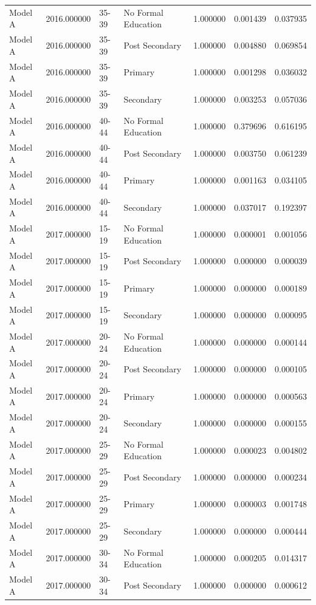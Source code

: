 \begin{table}[ht]
\begin{tabular}{lrllrrr}
Model A & 2016.000000 & 35-39 & No Formal Education & 1.000000 & 0.001439 & 0.037935 \\
Model A & 2016.000000 & 35-39 & Post Secondary & 1.000000 & 0.004880 & 0.069854 \\
Model A & 2016.000000 & 35-39 & Primary & 1.000000 & 0.001298 & 0.036032 \\
Model A & 2016.000000 & 35-39 & Secondary & 1.000000 & 0.003253 & 0.057036 \\
Model A & 2016.000000 & 40-44 & No Formal Education & 1.000000 & 0.379696 & 0.616195 \\
Model A & 2016.000000 & 40-44 & Post Secondary & 1.000000 & 0.003750 & 0.061239 \\
Model A & 2016.000000 & 40-44 & Primary & 1.000000 & 0.001163 & 0.034105 \\
Model A & 2016.000000 & 40-44 & Secondary & 1.000000 & 0.037017 & 0.192397 \\
Model A & 2017.000000 & 15-19 & No Formal Education & 1.000000 & 0.000001 & 0.001056 \\
Model A & 2017.000000 & 15-19 & Post Secondary & 1.000000 & 0.000000 & 0.000039 \\
Model A & 2017.000000 & 15-19 & Primary & 1.000000 & 0.000000 & 0.000189 \\
Model A & 2017.000000 & 15-19 & Secondary & 1.000000 & 0.000000 & 0.000095 \\
Model A & 2017.000000 & 20-24 & No Formal Education & 1.000000 & 0.000000 & 0.000144 \\
Model A & 2017.000000 & 20-24 & Post Secondary & 1.000000 & 0.000000 & 0.000105 \\
Model A & 2017.000000 & 20-24 & Primary & 1.000000 & 0.000000 & 0.000563 \\
Model A & 2017.000000 & 20-24 & Secondary & 1.000000 & 0.000000 & 0.000155 \\
Model A & 2017.000000 & 25-29 & No Formal Education & 1.000000 & 0.000023 & 0.004802 \\
Model A & 2017.000000 & 25-29 & Post Secondary & 1.000000 & 0.000000 & 0.000234 \\
Model A & 2017.000000 & 25-29 & Primary & 1.000000 & 0.000003 & 0.001748 \\
Model A & 2017.000000 & 25-29 & Secondary & 1.000000 & 0.000000 & 0.000444 \\
Model A & 2017.000000 & 30-34 & No Formal Education & 1.000000 & 0.000205 & 0.014317 \\
Model A & 2017.000000 & 30-34 & Post Secondary & 1.000000 & 0.000000 & 0.000612 \\

\end{tabular}
\end{table}

